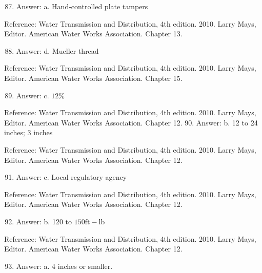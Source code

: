 \documentclass[10pt]{article}
\begin{document}
\begin{enumerate}
  \setcounter{enumi}{86}
  \item Answer: a. Hand-controlled plate tampers
\end{enumerate}

Reference: Water Transmission and Distribution, 4th edition. 2010. Larry Mays, Editor. American Water Works Association. Chapter 13.

\begin{enumerate}
  \setcounter{enumi}{87}
  \item Answer: d. Mueller thread
\end{enumerate}

Reference: Water Transmission and Distribution, 4th edition. 2010. Larry Mays, Editor. American Water Works Association. Chapter 15.

\begin{enumerate}
  \setcounter{enumi}{88}
  \item Answer: c. $12 \%$
\end{enumerate}

Reference: Water Transmission and Distribution, 4th edition. 2010. Larry Mays, Editor. American Water Works Association. Chapter 12. 90. Answer: b. 12 to 24 inches; 3 inches

Reference: Water Transmission and Distribution, 4th edition. 2010. Larry Mays, Editor. American Water Works Association. Chapter 12.

\begin{enumerate}
  \setcounter{enumi}{90}
  \item Answer: c. Local regulatory agency
\end{enumerate}

Reference: Water Transmission and Distribution, 4th edition. 2010. Larry Mays, Editor. American Water Works Association. Chapter 12.

\begin{enumerate}
  \setcounter{enumi}{91}
  \item Answer: b. 120 to $150 \mathrm{ft}-\mathrm{lb}$
\end{enumerate}

Reference: Water Transmission and Distribution, 4th edition. 2010. Larry Mays, Editor. American Water Works Association. Chapter 12.

\begin{enumerate}
  \setcounter{enumi}{92}
  \item Answer: a. 4 inches or smaller.
\end{enumerate}
\end{document}
